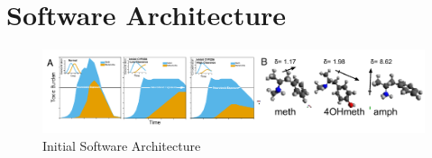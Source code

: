 \section{Software Architecture}\label{software_architecture}

\begin{figure}[h] %
       \centering
       \includegraphics[scale = .80]{Figures/Fig2.pdf}
       \caption{\footnotesize Initial Software Architecture}
       \label{fig2}
\end{figure}

